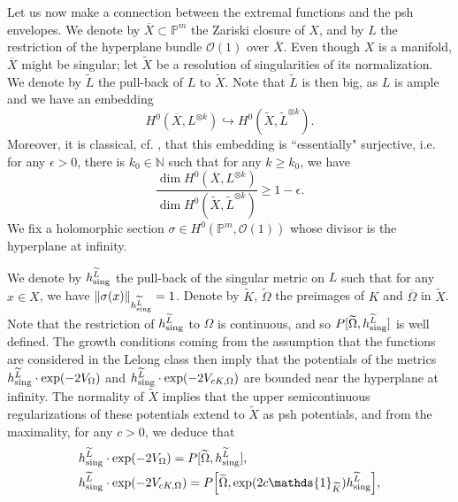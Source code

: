 \documentclass[12pt]{article}
\numberwithin{equation}{section}
\theoremstyle{theorem}
\theoremstyle{definition}
\theoremstyle{remark}
\newcommand{\nat}{\mathbb{N}}
\begin{document}
	\par 
	Let us now make a connection between the extremal functions and the psh envelopes.
	We denote by $\overline{X} \subset \mathbb{P}^m$ the Zariski closure of $X$, and by $L$ the restriction of the hyperplane bundle $\mathscr{O}(1)$ over $\overline{X}$.
	Even though $X$ is a manifold, $\overline{X}$ might be singular; let $\widetilde{X}$ be a resolution of singularities of its normalization.
	We denote by $\widetilde{L}$ the pull-back of $L$ to $\widetilde{X}$.
	Note that $\widetilde{L}$ is then big, as $L$ is ample and we have an embedding
	\begin{equation}
		H^0(\overline{X}, L^{\otimes k})
		\hookrightarrow
		H^0(\widetilde{X}, \widetilde{L}^{\otimes k}).
	\end{equation}
	Moreover, it is classical, cf. \cite[proof of Lemma 2.2.3]{LazarBookI}, that this embedding is “essentially" surjective, i.e. for any $\epsilon > 0$, there is $k_0 \in \nat$ such that for any $k \geq k_0$, we have
	\begin{equation}\label{eq_as_surj}
		\frac{\dim H^0(\overline{X}, L^{\otimes k})}{\dim H^0(\widetilde{X}, \widetilde{L}^{\otimes k})} 
		\geq
		1 - \epsilon.
	\end{equation}
	We fix a holomorphic section $\sigma \in H^0(\mathbb{P}^m, \mathscr{O}(1))$ whose divisor is the hyperplane at infinity.
	\par
	We denote by $h^{\widetilde{L}}_{{\rm{sing}}}$ the pull-back of the singular metric on $L$ such that for any $x \in X$, we have $\| \sigma(x) \|_{h^{\widetilde{L}}_{{\rm{sing}}}} = 1$.
	Denote by $\widetilde{K}$, $\widetilde{\Omega}$ the preimages of $K$ and $\overline{\Omega}$ in $\widetilde{X}$.
	Note that the restriction of $h^{\widetilde{L}}_{{\rm{sing}}}$ to $\Omega$ is continuous, and so $P[\widetilde{\Omega}, h^{\widetilde{L}}_{{\rm{sing}}}]$ is well defined.
	The growth conditions coming from the assumption that the functions are considered in the Lelong class then imply that the potentials of the metrics $h^{\widetilde{L}}_{{\rm{sing}}} \cdot \exp(- 2 V_{\Omega})$ and $h^{\widetilde{L}}_{{\rm{sing}}} \cdot \exp(- 2 V_{c K, \Omega})$ are bounded near the hyperplane at infinity.
	The normality of $\widetilde{X}$ implies that the upper semicontinuous regularizations of these potentials extend to $\widetilde{X}$ as psh potentials, and from the maximality, for any $c > 0$, we deduce that
	\begin{equation}\label{eq_metr_pot0}
	\begin{aligned}
		&
		h^{\widetilde{L}}_{{\rm{sing}}} \cdot \exp(- 2 V_{\Omega})
		=
		P[\widetilde{\Omega}, h^{\widetilde{L}}_{{\rm{sing}}}],
		\\
		&
		h^{\widetilde{L}}_{{\rm{sing}}} \cdot \exp(- 2 V_{c K, \Omega})
		=
		P\Big[\widetilde{\Omega}, \exp(2 c \mathds{1}_{\widetilde{K}}) h^{\widetilde{L}}_{{\rm{sing}}} \Big],
	\end{aligned}
	\end{equation}
\end{document}
